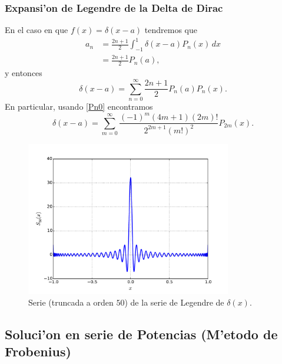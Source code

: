\subsubsection{Expansi'on de Legendre de la Delta de Dirac}
En el caso en que $f(x)=\delta(x-a)$ tendremos que
\begin{align}
a_n &= \frac{2n+1}{2}\int_{-1}^1 \delta(x-a)P_n(x)\,dx \\
&= \frac{2n+1}{2}P_n(a),
\end{align}
y entonces
\begin{equation}
\delta(x-a)=\sum_{n=0}^\infty \frac{2n+1}{2}P_n(a)P_n(x).
\end{equation}
En particular, usando \eqref{Pn0} encontramos
\begin{equation}
\delta(x-a)=\sum_{m=0}^\infty \frac{(-1)^m(4m+1)(2m)!}{2^{2m+1}(m!)^2}P_{2m}(x).
\end{equation}

\begin{figure}[H]
\centering
\includegraphics[angle=0,width=0.8\textwidth]{figs/fig-Legendre-serie-Delta.pdf}
\caption{Serie (truncada a orden $50$) de la serie de Legendre de $\delta(x)$.}
\label{fig-DSL}
\end{figure}

\subsection{Soluci'on en serie de Potencias (M'etodo de Frobenius)}\label{sec:FrobLeg}


